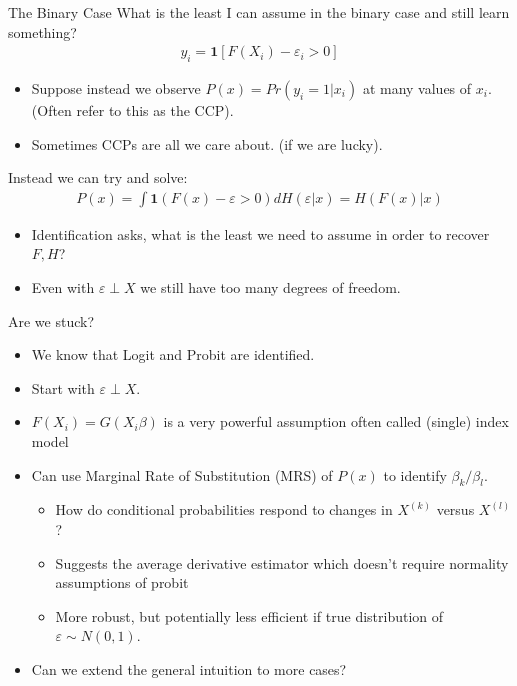 \begin{frame}{The Binary Case}
What is the least I can assume in the binary case and still learn something?
\begin{eqnarray*}
y_i = \mathbf{1}[F(X_i) - \varepsilon_i > 0]
\end{eqnarray*}
\begin{itemize}
\item Suppose instead we observe $P(x) = Pr(y_i = 1 | x_i)$ at many values of $x_i$. (Often refer to this as the CCP).
\item Sometimes CCPs are all we care about. (if we are lucky).
\end{itemize}
Instead we can try and solve:
\begin{eqnarray*}
P(x) = \int \mathbf{1}(F(x) - \varepsilon > 0) dH(\varepsilon | x) = H(F(x)| x)
\end{eqnarray*}
\begin{itemize}
\item Identification asks, what is the least we need to assume in order to recover $F,H$?
\item Even with $\varepsilon \perp X$ we still have too many degrees of freedom.
\end{itemize}
\end{frame}

\begin{frame}{Are we stuck?}

\begin{itemize}
\item We know that Logit and Probit are identified.
\item Start with $\varepsilon \perp X$.
\item $F(X_i) = G(X_i \beta)$ is a very powerful assumption often called \alert{(single) index model}
\item Can use Marginal Rate of Substitution (MRS) of $P(x)$ to identify $\beta_k / \beta_l$.
\begin{itemize}
\item How do conditional probabilities respond to changes in $X^{(k)}$ versus $X^{(l)}$?
\item Suggests the \alert{average derivative estimator} which doesn't require normality assumptions of probit
\item More robust, but potentially less efficient if true distribution of $\varepsilon \sim N(0,1)$.
\end{itemize}
\item Can we extend the general intuition to more cases?
\end{itemize}
\end{frame}


